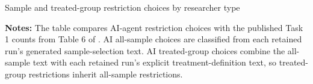 \begin{table}[!htbp]
\centering
\caption{Sample and treated-group restriction choices by researcher type}
\label{tab:sample-restrictions}
\small
\resizebox{\textwidth}{!}{}
\caption*{\textbf{Notes:} The table compares AI-agent restriction choices with the published Task 1 counts from Table 6 of \citet{huntingtonklein2025sources}. AI all-sample choices are classified from each retained run's generated sample-selection text. AI treated-group choices combine the all-sample text with each retained run's explicit treatment-definition text, so treated-group restrictions inherit all-sample restrictions.}
\end{table}
\FloatBarrier